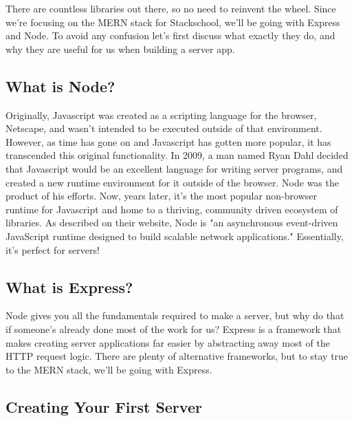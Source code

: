 There are countless libraries out there, so no need to reinvent the wheel. Since we're focusing on the MERN stack for Stackschool, we'll be going with Express and Node. To avoid any confusion let's first discuss what exactly they do, and why they are useful for us when building a server app.

\subsection*{What is Node?}

Originally, Javascript was created as a scripting language for the browser, Netscape, and wasn't intended to be executed outside of that environment. However, as time has gone on and Javascript has gotten more popular, it has transcended this original functionality. In 2009, a man named Ryan Dahl decided that Javascript would be an excellent language for writing server programs, and created a new runtime environment for it outside of the browser. Node was the product of his efforts. Now, years later, it's the most popular non-browser runtime for Javascript and home to a thriving, community driven ecosystem of libraries. As described on their website, Node is "an asynchronous event-driven JavaScript runtime designed to build scalable network applications." Essentially, it's perfect for servers!

\subsection*{What is Express?}

Node gives you all the fundamentals required to make a server, but why do that if someone's already done most of the work for us? Express is a framework that makes creating server applications far easier by abstracting away most of the HTTP request logic. There are plenty of alternative frameworks, but to stay true to the MERN stack, we'll be going with Express.

\subsection*{Creating Your First Server}

